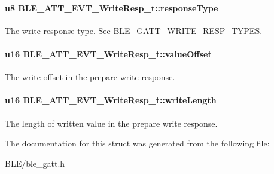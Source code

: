 \paragraph[{\texorpdfstring{response\+Type}{responseType}}]{\setlength{\rightskip}{0pt plus 5cm}u8 B\+L\+E\+\_\+\+A\+T\+T\+\_\+\+E\+V\+T\+\_\+\+Write\+Resp\+\_\+t\+::response\+Type}\hypertarget{struct_b_l_e___a_t_t___e_v_t___write_resp__t_a6908f020851f87349cfc09d97f877a8c}{}\label{struct_b_l_e___a_t_t___e_v_t___write_resp__t_a6908f020851f87349cfc09d97f877a8c}
The write response type. See \hyperlink{group___b_l_e___g_a_t_t___w_r_i_t_e___r_e_s_p___t_y_p_e_s}{B\+L\+E\+\_\+\+G\+A\+T\+T\+\_\+\+W\+R\+I\+T\+E\+\_\+\+R\+E\+S\+P\+\_\+\+T\+Y\+P\+ES}. 
\paragraph[{\texorpdfstring{value\+Offset}{valueOffset}}]{\setlength{\rightskip}{0pt plus 5cm}u16 B\+L\+E\+\_\+\+A\+T\+T\+\_\+\+E\+V\+T\+\_\+\+Write\+Resp\+\_\+t\+::value\+Offset}\hypertarget{struct_b_l_e___a_t_t___e_v_t___write_resp__t_a95829606ee80fe5e91c03ac36b1fa49e}{}\label{struct_b_l_e___a_t_t___e_v_t___write_resp__t_a95829606ee80fe5e91c03ac36b1fa49e}
The write offset in the prepare write response. 
\paragraph[{\texorpdfstring{write\+Length}{writeLength}}]{\setlength{\rightskip}{0pt plus 5cm}u16 B\+L\+E\+\_\+\+A\+T\+T\+\_\+\+E\+V\+T\+\_\+\+Write\+Resp\+\_\+t\+::write\+Length}\hypertarget{struct_b_l_e___a_t_t___e_v_t___write_resp__t_a30b51eac221d63c08eb88275c2e82f9d}{}\label{struct_b_l_e___a_t_t___e_v_t___write_resp__t_a30b51eac221d63c08eb88275c2e82f9d}
The length of written value in the prepare write response. 

The documentation for this struct was generated from the following file\+:\begin{DoxyCompactItemize}
\item 
B\+L\+E/ble\+\_\+gatt.\+h\end{DoxyCompactItemize}
